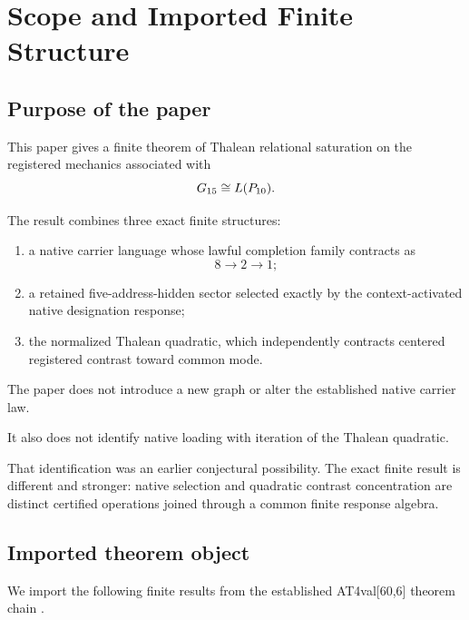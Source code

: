\section{Scope and Imported Finite Structure}

\subsection{Purpose of the paper}

This paper gives a finite theorem of Thalean relational saturation on
the registered mechanics associated with
\[
G_{15}\cong L(P_{10}).
\]

The result combines three exact finite structures:

\begin{enumerate}[label=(\roman*)]

\item a native carrier language whose lawful completion family
contracts as
\[
8\longrightarrow2\longrightarrow1;
\]

\item a retained five-address-hidden sector selected exactly by the
context-activated native designation response;

\item the normalized Thalean quadratic, which independently contracts
centered registered contrast toward common mode.

\end{enumerate}

The paper does not introduce a new graph or alter the established
native carrier law.

It also does not identify native loading with iteration of the
Thalean quadratic.

That identification was an earlier conjectural possibility.  The
exact finite result is different and stronger: native selection and
quadratic contrast concentration are distinct certified operations
joined through a common finite response algebra.

\subsection{Imported theorem object}

We import the following finite results from the established
AT4val[60,6] theorem chain
\citep{cave2026dodecahedral,cave2026quantumrelativity}.

